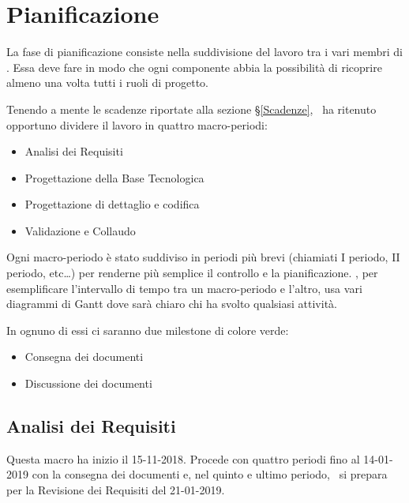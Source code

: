 \newpage
\section{Pianificazione}\label{Pianificazione}
	La fase di pianificazione consiste nella suddivisione del lavoro tra i vari membri di \gruppo.
	Essa deve fare in modo che ogni componente abbia la possibilità di ricoprire almeno una volta tutti i ruoli di progetto.
    
    Tenendo a mente le scadenze riportate alla sezione \S\ref{Scadenze}, \gruppo\ ha ritenuto opportuno dividere il lavoro in quattro macro-periodi:
	\begin{itemize}
	\item Analisi dei Requisiti
	\item Progettazione della Base Tecnologica
	\item Progettazione di dettaglio e codifica
	\item Validazione e Collaudo
	\end{itemize}

	Ogni macro-periodo è stato suddiviso in periodi più brevi (chiamiati I periodo, II periodo, etc\dots) per renderne più semplice il
    controllo e la pianificazione. \gruppo, per esemplificare l'intervallo di tempo tra un macro-periodo e l'altro, usa vari
    diagrammi di Gantt dove sarà chiaro chi ha svolto qualsiasi attività.

    In ognuno di essi ci saranno due milestone di colore verde:

    \begin{itemize}
    	\item Consegna dei documenti
    	\item Discussione dei documenti
    \end{itemize}

    \subsection{Analisi dei Requisiti}
        Questa macro ha inizio il 15-11-2018. Procede con quattro periodi fino al 14-01-2019 con la consegna dei documenti e, nel
        quinto e ultimo  periodo, \gruppo\ si prepara per la Revisione dei Requisiti del 21-01-2019.
        
